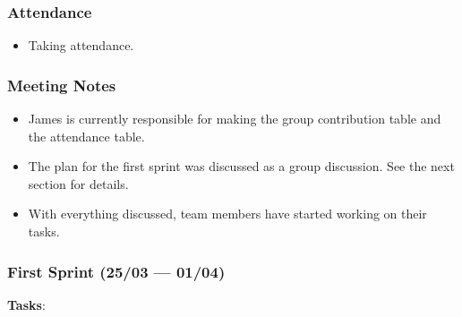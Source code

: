 \documentclass[11pt]{article}
\begin{document}
\hypertarget{attendance}{%
\subsubsection{Attendance}\label{attendance}}

\begin{itemize}
\tightlist
\item
  Taking attendance.
\end{itemize}

\hypertarget{meeting-notes}{%
\subsubsection{Meeting Notes}\label{meeting-notes}}

\begin{itemize}
\tightlist
\item
  James is currently responsible for making the group contribution table
  and the attendance table.
\item
  The plan for the first sprint was discussed as a group discussion. See
  the next section for details.
\item
  With everything discussed, team members have started working on their
  tasks.
\end{itemize}

\hypertarget{first-sprint-2503-0104}{%
\subsubsection{First Sprint (25/03 ---
01/04)}\label{first-sprint-2503-0104}}

\textbf{Tasks}:
\end{document}
